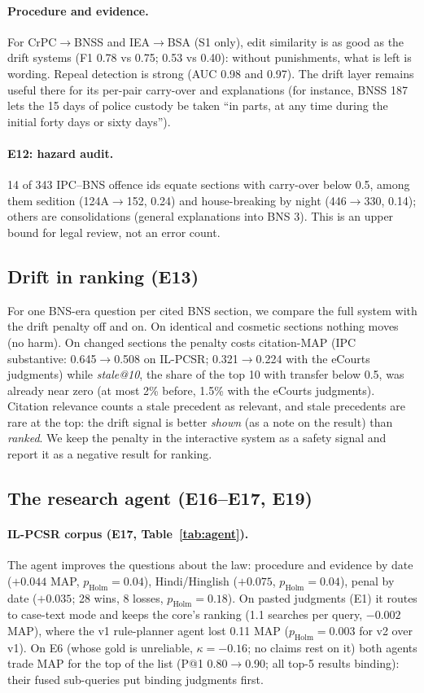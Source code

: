 \documentclass[sigconf,nonacm]{acmart}
\newcommand{\ph}{p_{\text{Holm}}}
\begin{document}
\paragraph{Procedure and evidence.} For CrPC$\to$BNSS and IEA$\to$BSA (S1 only), edit similarity is
as good as the drift systems (F1 0.78 vs 0.75; 0.53 vs 0.40): without punishments, what is left is
wording. Repeal detection is strong (AUC 0.98 and 0.97). The drift layer remains useful there for
its per-pair carry-over and explanations (for instance, BNSS 187 lets the 15 days of police custody
be taken ``in parts, at any time during the initial forty days or sixty days'').

\paragraph{E12: hazard audit.} 14 of 343 IPC--BNS offence ids equate sections with carry-over below
0.5, among them sedition (124A$\to$152, 0.24) and house-breaking by night (446$\to$330, 0.14);
others are consolidations (general explanations into BNS 3). This is an upper bound for legal
review, not an error count.

\subsection{Drift in ranking (E13)}\label{sec:res-e13}

For one BNS-era question per cited BNS section, we compare the full system with the drift penalty
off and on. On identical and cosmetic sections nothing moves (no harm). On changed sections the
penalty costs citation-MAP (IPC substantive: 0.645$\to$0.508 on IL-PCSR; 0.321$\to$0.224 with the
eCourts judgments) while \emph{stale@10}, the share of the top 10 with transfer below 0.5, was
already near zero (at most 2\% before, 1.5\% with the eCourts judgments). Citation relevance counts a
stale precedent as relevant, and stale precedents are rare at the top: the drift signal is better
\emph{shown} (as a note on the result) than \emph{ranked}. We keep the penalty in the interactive
system as a safety signal and report it as a negative result for ranking.

\subsection{The research agent (E16--E17, E19)}

\paragraph{IL-PCSR corpus (E17, Table~\ref{tab:agent}).} The agent improves the questions about the
law: procedure and evidence by date ($+0.044$ MAP, $\ph=0.04$), Hindi/Hinglish ($+0.075$,
$\ph=0.04$), penal by date ($+0.035$; 28 wins, 8 losses, $\ph=0.18$). On pasted judgments (E1) it
routes to case-text mode and keeps the core's ranking (1.1 searches per query, $-0.002$ MAP), where
the v1 rule-planner agent lost 0.11 MAP ($\ph=0.003$ for v2 over v1). On E6 (whose gold is unreliable, $\kappa=-0.16$; no claims rest on it) both agents trade MAP
for the top of the list (P@1 0.80$\to$0.90; all top-5 results binding): their fused sub-queries put
binding judgments first.
\end{document}
